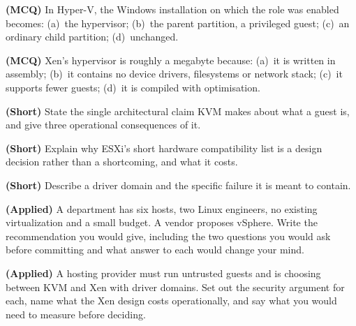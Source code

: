 \begin{reviewq}
  \item \textbf{(MCQ)} In Hyper-V, the Windows installation on which the role
        was enabled becomes: (a)~the hypervisor; (b)~the parent partition, a
        privileged guest; (c)~an ordinary child partition; (d)~unchanged.
  \item \textbf{(MCQ)} Xen's hypervisor is roughly a megabyte because:
        (a)~it is written in assembly; (b)~it contains no device drivers,
        filesystems or network stack; (c)~it supports fewer guests;
        (d)~it is compiled with optimisation.
  \item \textbf{(Short)} State the single architectural claim KVM makes about
        what a guest is, and give three operational consequences of it.
  \item \textbf{(Short)} Explain why ESXi's short hardware compatibility list
        is a design decision rather than a shortcoming, and what it costs.
  \item \textbf{(Short)} Describe a driver domain and the specific failure it
        is meant to contain.
  \item \textbf{(Applied)} A department has six hosts, two Linux engineers, no
        existing virtualization and a small budget. A vendor proposes vSphere.
        Write the recommendation you would give, including the two questions
        you would ask before committing and what answer to each would change
        your mind.
  \item \textbf{(Applied)} A hosting provider must run untrusted guests and is
        choosing between KVM and Xen with driver domains. Set out the security
        argument for each, name what the Xen design costs operationally, and
        say what you would need to measure before deciding.
\end{reviewq}
